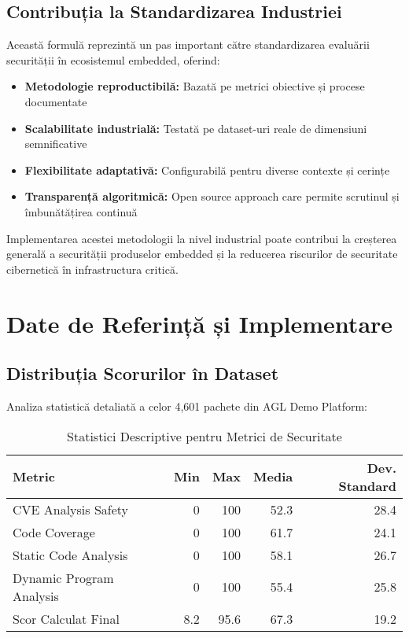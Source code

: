\documentclass[12pt,a4paper]{article}
\begin{document}
\subsection{Contribuția la Standardizarea Industriei}

Această formulă reprezintă un pas important către standardizarea evaluării securității în ecosistemul embedded, oferind:

\begin{itemize}
\item \textbf{Metodologie reproductibilă:} Bazată pe metrici obiective și procese documentate
\item \textbf{Scalabilitate industrială:} Testată pe dataset-uri reale de dimensiuni semnificative
\item \textbf{Flexibilitate adaptativă:} Configurabilă pentru diverse contexte și cerințe
\item \textbf{Transparență algoritmică:} Open source approach care permite scrutinul și îmbunătățirea continuă
\end{itemize}

Implementarea acestei metodologii la nivel industrial poate contribui la creșterea generală a securității produselor embedded și la reducerea riscurilor de securitate cibernetică în infrastructura critică.

\newpage

\appendix
\section{Date de Referință și Implementare}

\subsection{Distribuția Scorurilor în Dataset}

Analiza statistică detaliată a celor 4,601 pachete din AGL Demo Platform:

\begin{table}[H]
\centering
\caption{Statistici Descriptive pentru Metrici de Securitate}
\begin{tabular}{@{}lrrrr@{}}
\toprule
\textbf{Metric} & \textbf{Min} & \textbf{Max} & \textbf{Media} & \textbf{Dev. Standard} \\
\midrule
CVE Analysis Safety & 0 & 100 & 52.3 & 28.4 \\
Code Coverage & 0 & 100 & 61.7 & 24.1 \\
Static Code Analysis & 0 & 100 & 58.1 & 26.7 \\
Dynamic Program Analysis & 0 & 100 & 55.4 & 25.8 \\
Scor Calculat Final & 8.2 & 95.6 & 67.3 & 19.2 \\
\bottomrule
\end{tabular}
\end{table}
\end{document}
